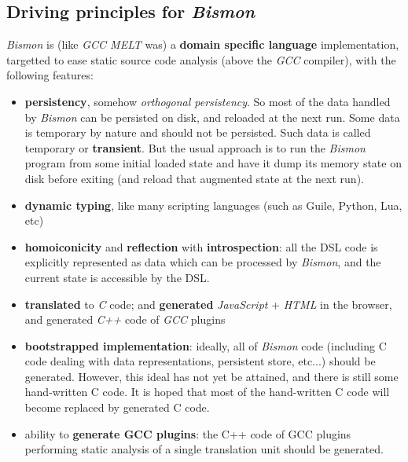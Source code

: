 \subsection{Driving principles for  \textit{Bismon}}

\textit{Bismon} is (like \textit{GCC MELT} was) a \textbf{domain
  specific language} implementation, targetted to ease static source
code analysis (above the \textit{GCC} compiler), with the following
features:

\begin{itemize}

  \item \textbf{persistency}, somehow \textit{orthogonal
    persistency}. So most of the data handled by \textit{Bismon} can
    be persisted on disk, and reloaded at the next run. Some data is
    temporary by nature and should not be persisted. Such data is
    called temporary or \textbf{transient}. But the usual approach is
    to run the \textit{Bismon} program from some initial loaded state
    and have it dump its memory state on disk before exiting (and
    reload that augmented state at the next run).

  \item \textbf{dynamic typing}, like many scripting languages (such
    as Guile, Python, Lua, etc)

  \item \textbf{homoiconicity} and \textbf{reflection} with
    \textbf{introspection}: all the DSL code is explicitly represented
    as data which can be processed by \textit{Bismon}, and the current
    state is accessible by the DSL.

    \item \textbf{translated} to \emph{C} code; and \textbf{generated}
      \emph{JavaScript} + \emph{HTML} in the browser, and generated
      \emph{C++} code of \emph{GCC} plugins

    \item \textbf{bootstrapped implementation}: ideally, all of
      \textit{Bismon} code (including C code dealing with data
      representations, persistent store, etc...) should be
      generated. However, this ideal has not yet be attained, and
      there is still some hand-written C code. It is hoped that most
      of the hand-written C code will become replaced by generated C
      code.
    \item ability to \textbf{generate GCC plugins}: the C++ code of
      GCC plugins performing static analysis of a single translation
      unit should be generated.


\end{itemize}
